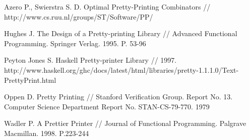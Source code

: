 
% 
% 

\begin{thebibliography}{9001}
  
	 Azero P., Swierstra S. D. Optimal Pretty-Printing Combinators // http://www.cs.ruu.nl/groups/ST/Software/PP/

	 Hughes J. The Design of a Pretty-printing Library // Advanced Functional Programming. Springer Verlag. 1995. P. 53-96

	 Peyton Jones S. Haskell Pretty-printer Library // 1997. http://www.haskell.org/ghc/docs/latest/html/libraries/pretty-1.1.1.0/Text-PrettyPrint.html

	 Oppen D. Pretty Printing // Stanford Verification Group. Report No. 13. Computer Science Department Report No. STAN-CS-79-770. 1979

	 Wadler P. A Prettier Printer // Journal of Functional Programming. Palgrave Macmillan. 1998. P.223-244

\end{thebibliography}